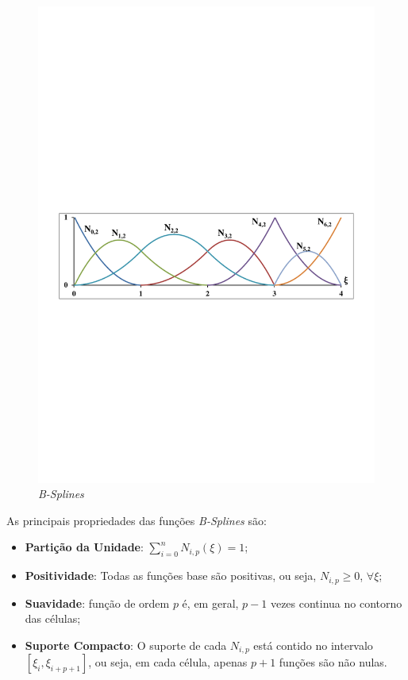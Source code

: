 \documentclass[tese_patricia]{subfiles}
\begin{document}
\begin{figure}[htb!]
	\centering 
	\includegraphics[scale=0.7,trim=0cm 11cm 0cm 12cm, clip=true]{Imagens/Cap2/B-splines1.pdf}	
	\caption{\textit{B-Splines}}
	\label{fig:b-splines}
\end{figure}

As principais propriedades das funções \textit{B-Splines} são:

\begin{itemize}
	\item \textbf{Partição da Unidade}: $\sum_{i=0}^{n}N_{i,p}(\xi)=1 $;
	\item \textbf{Positividade}: Todas as funções base são positivas, ou seja, $N_{i,p}\geq0$, $\forall\xi$;
	\item \textbf{Suavidade}: função de ordem $p$ é, em geral, $p-1$ vezes continua no contorno das células;
	\item \textbf{Suporte Compacto}: O suporte de cada $N_{i,p}$ está contido no intervalo $\left[\xi_i,\xi_{i+p+1}\right]$, ou seja, em cada célula, apenas $p+1$ funções são não nulas. %
\end{itemize}
\end{document}
